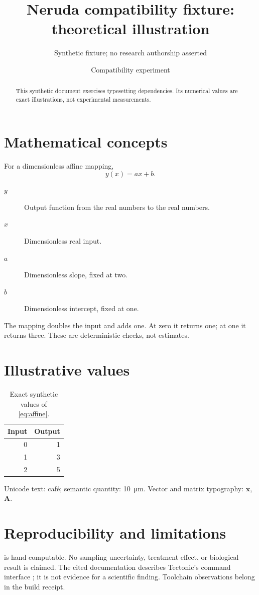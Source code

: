 \documentclass[11pt]{article}
\title{Neruda compatibility fixture: theoretical illustration}
\author{Synthetic fixture; no research authorship asserted}
\date{Compatibility experiment}
\begin{document}
\maketitle
\begin{abstract}
This synthetic document exercises typesetting dependencies. Its numerical
values are exact illustrations, not experimental measurements.
\end{abstract}
\section{Mathematical concepts}
For a dimensionless affine mapping,
\begin{equation}\label{eq:affine}
 y(x)=a x+b.
\end{equation}
\begin{description}
\item[$y$] Output function from the real numbers to the real numbers.
\item[$x$] Dimensionless real input.
\item[$a$] Dimensionless slope, fixed at two.
\item[$b$] Dimensionless intercept, fixed at one.
\end{description}
The mapping doubles the input and adds one. At zero it returns one;
at one it returns three. These are deterministic checks, not estimates.
\section{Illustrative values}
\begin{table}[ht]
\centering
\begin{tabular}{rr}\toprule Input & Output\\\midrule
0 & 1\\1 & 3\\2 & 5\\\bottomrule\end{tabular}
\caption{Exact synthetic values of \cref{eq:affine}.}\label{tab:values}
\end{table}
\begin{center}\end{center}
Unicode text: café; semantic quantity: \SI{10}{\micro\metre}.
Vector and matrix typography: $\symbf{x}$, $\symbf{A}$.
\section{Reproducibility and limitations}
 is hand-computable. No sampling uncertainty, treatment
effect, or biological result is claimed. The cited documentation describes
Tectonic's command interface \cite{tectonic-interface}; it is not evidence
for a scientific finding. Toolchain observations belong in the build receipt.
\printbibliography
\end{document}

